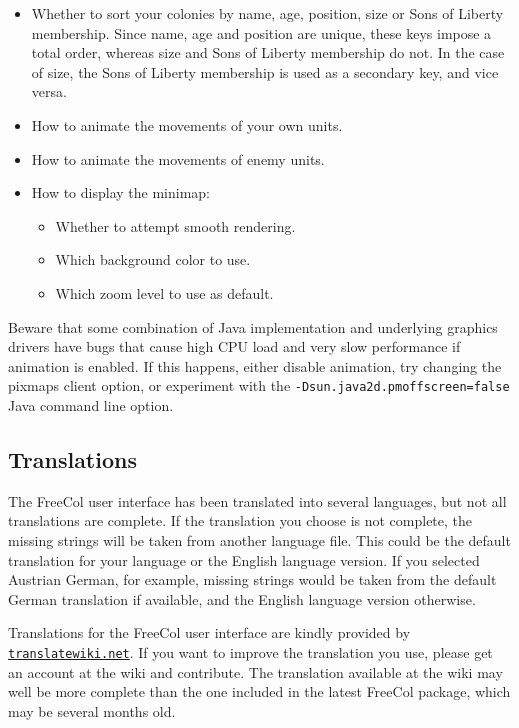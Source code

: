 \documentclass[12pt]{book}
\begin{document}
\begin{itemize}
\item Whether to sort your colonies by name, age, position, size or
Sons of Liberty membership. Since name, age and position are unique,
these keys impose a total order, whereas size and Sons of Liberty
membership do not. In the case of size, the Sons of Liberty membership
is used as a secondary key, and vice versa.

\item How to animate the movements of your own units.

\item How to animate the movements of enemy units.

\item How to display the minimap:

\begin{itemize}
\item Whether to attempt smooth rendering.

\item Which background color to use.

\item Which zoom level to use as default.
\end{itemize}

\end{itemize}

Beware that some combination of Java implementation and underlying
graphics drivers have bugs that cause high CPU load and very slow
performance if animation is enabled. If this happens, either disable
animation, try changing the pixmaps client option, or experiment with
the \texttt{-Dsun.java2d.pmoffscreen=false} Java command line option.


\hypertarget{translations}{\subsection{Translations}}

The FreeCol user interface has been translated into several languages,
but not all translations are complete. If the translation you choose
is not complete, the missing strings will be taken from another
language file. This could be the default translation for your language
or the English language version. If you selected Austrian German, for
example, missing strings would be taken from the default German
translation if available, and the English language version
otherwise.

Translations for the FreeCol user interface are kindly provided by
\href{http://translatewiki.net}{\tt trans\-late\-wiki.net}. If you want to
improve the translation you use, please get an account at the wiki and
contribute. The translation available at the wiki may well be more
complete than the one included in the latest FreeCol package, which
may be several months old.
\end{document}
